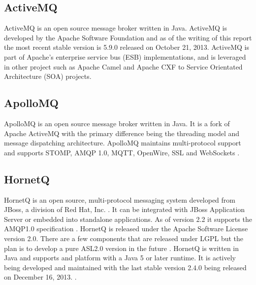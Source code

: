 \documentclass{thesis}
\begin{document}
\subsection{ActiveMQ}
ActiveMQ is an open source message broker written in Java.  ActiveMQ is developed by the Apache Software Foundation and as of the writing of this report the most recent stable version is 5.9.0 released on October 21, 2013.  ActiveMQ is part of Apache's enterprise service bus (ESB) implementations, and is leveraged in other project such as Apache Camel and Apache CXF to Service Orientated Architecture (SOA) projects. %

\subsection{ApolloMQ}
ApolloMQ is an open source message broker written in Java.  It is a fork of Apache ActiveMQ with the primary difference being the threading model and message dispatching architecture.  ApolloMQ maintains multi-protocol support and supports STOMP, AMQP 1.0, MQTT, OpenWire, SSL and WebSockets \cite{APOLLO}.

\subsection{HornetQ}
HornetQ is an open source, multi-protocol messaging system developed from JBoss, a division of Red Hat, Inc. \cite{REDHAT}.  It can be integrated with JBoss Application Server or embedded into standalone applications.  As of version 2.2 it supports the AMQP1.0 specification \cite{HORNETQ_ROADMAP}.  HornetQ is released under the Apache Software License version 2.0.  There are a few components that are released under LGPL but the plan is to develop a pure ASL2.0 version in the future .  HornetQ is written in Java and supports and platform with a Java 5 or later runtime.   It is actively being developed and maintained with the last stable version 2.4.0 being released on December 16, 2013. \cite{HORNETQ}.  

\end{document}
